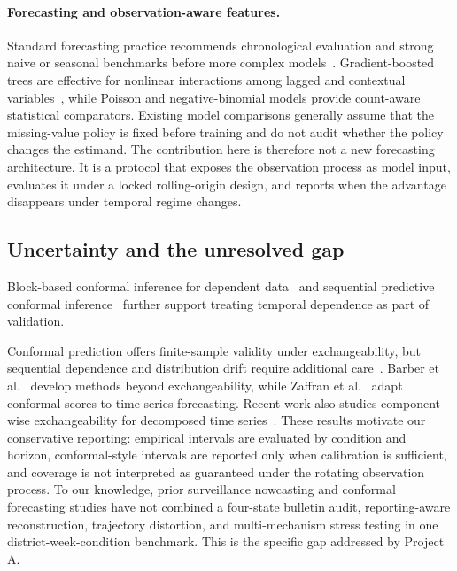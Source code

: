 \documentclass[runningheads]{llncs}
\begin{document}
\paragraph{Forecasting and observation-aware features.}

Standard forecasting practice recommends chronological evaluation and strong naive or seasonal benchmarks before more complex models~\cite{hyndman2021forecasting}. Gradient-boosted trees are effective for nonlinear interactions among lagged and contextual variables~\cite{ke2017lightgbm}, while Poisson and negative-binomial models provide count-aware statistical comparators. Existing model comparisons generally assume that the missing-value policy is fixed before training and do not audit whether the policy changes the estimand. The contribution here is therefore not a new forecasting architecture. It is a protocol that exposes the observation process as model input, evaluates it under a locked rolling-origin design, and reports when the advantage disappears under temporal regime changes.

\subsection{Uncertainty and the unresolved gap}

Block-based conformal inference for dependent data~\cite{chernozhukov2018exact} and sequential predictive conformal inference~\cite{xu2023sequential} further support treating temporal dependence as part of validation.

Conformal prediction offers finite-sample validity under exchangeability, but sequential dependence and distribution drift require additional care~\cite{vovk2005algorithmic,romano2019conformal}. Barber et al.~\cite{barber2023conformal} develop methods beyond exchangeability, while Zaffran et al.~\cite{zaffran2022adaptive} adapt conformal scores to time-series forecasting. Recent work also studies component-wise exchangeability for decomposed time series~\cite{prinzhorn2024conformal}. These results motivate our conservative reporting: empirical intervals are evaluated by condition and horizon, conformal-style intervals are reported only when calibration is sufficient, and coverage is not interpreted as guaranteed under the rotating observation process. To our knowledge, prior surveillance nowcasting and conformal forecasting studies have not combined a four-state bulletin audit, reporting-aware reconstruction, trajectory distortion, and multi-mechanism stress testing in one district-week-condition benchmark. This is the specific gap addressed by Project A.
\end{document}
